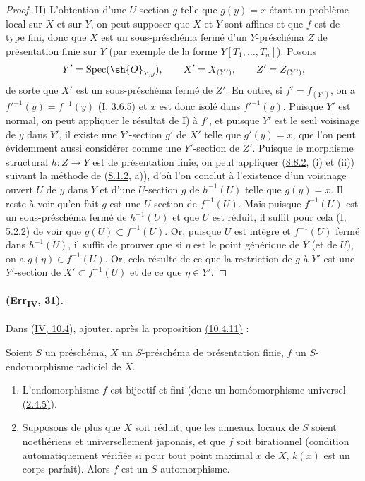 \begin{proof}
\textup{II)} L'obtention d'une $U$-section $g$ telle que $g(y)=x$ étant
un problème local sur $X$ et sur $Y$, on peut supposer que $X$ et $Y$
sont affines et que $f$ est de type fini, donc que $X$ est un
sous-préschéma fermé d'un $Y$-préschéma $Z$ de présentation finie sur
$Y$ (par exemple de la forme $Y[T_1,\ldots,T_n]$). Posons
\[
 Y'=\operatorname{Spec}(\sh{O}_{Y,y}),\qquad
 X'=X_{(Y')},\qquad Z'=Z_{(Y')},
\]
de sorte que $X'$ est un sous-préschéma fermé de $Z'$. En outre, si
$f'=f_{(Y')}$, on a $f'^{-1}(y)=f^{-1}(y)$ (I, 3.6.5) et $x$ est donc
isolé dans $f'^{-1}(y)$. Puisque $Y'$ est normal, on peut appliquer le
résultat de I) à $f'$, et puisque $Y'$ est le seul voisinage de $y$ dans
$Y'$, il existe une $Y'$-section $g'$ de $X'$ telle que $g'(y)=x$, que
l'on peut évidemment aussi considérer comme une $Y'$-section de $Z'$.
Puisque le morphisme structural $h:Z\to Y$ est de présentation finie,
on peut appliquer ({\hyperref[canon-index.ega4.c04.thm.8-8-2]{8.8.2}}, (i) et
(ii)) suivant la méthode de
({\hyperref[canon-index.ega4.c04.statement.8-1-2]{8.1.2}}, a)), d'où l'on conclut
à l'existence d'un voisinage ouvert $U$ de $y$ dans $Y$ et d'une
$U$-section $g$ de $h^{-1}(U)$ telle que $g(y)=x$. Il reste à voir
qu'en fait $g$ est une $U$-section de $f^{-1}(U)$. Mais puisque
$f^{-1}(U)$ est un sous-préschéma fermé de $h^{-1}(U)$ et que $U$ est
réduit, il suffit pour cela (I, 5.2.2) de voir que
$g(U)\subset f^{-1}(U)$. Or, puisque $U$ est intègre et $f^{-1}(U)$
fermé dans $h^{-1}(U)$, il suffit de prouver que si $\eta$ est le point
générique de $Y$ (et de $U$), on a $g(\eta)\in f^{-1}(U)$. Or, cela
résulte de ce que la restriction de $g$ à $Y'$ est une $Y'$-section de
$X'\subset f^{-1}(U)$ et de ce que $\eta\in Y'$.
\end{proof}

\paragraph{(Err\textsubscript{IV}, 31).}
Dans ({\hyperref[canon-index.ega4.c04.subsec.10-4]{IV, 10.4}}), ajouter, après la
proposition {\hyperref[canon-index.ega4.c04.statement.10-4-11]{(10.4.11)}} :

\begin{corollary}[10.4.12]
Soient $S$ un préschéma, $X$ un $S$-préschéma de présentation finie,
$f$ un $S$-endomorphisme radiciel de $X$.
\begin{enumerate}[label=\textup{(\roman*)}]
\item L'endomorphisme $f$ est bijectif et fini (donc un homéomorphisme
universel {\hyperref[canon-index.ega4.c04.prop.2-4-5]{(2.4.5)}}).
\item Supposons de plus que $X$ soit réduit, que les anneaux locaux de
$S$ soient noethériens et universellement japonais, et que $f$ soit
birationnel (condition automatiquement vérifiée si pour tout point
maximal $x$ de $X$, $k(x)$ est un corps parfait). Alors $f$ est un
$S$-automorphisme.
\end{enumerate}
\end{corollary}


